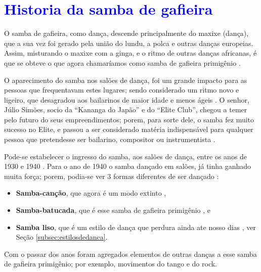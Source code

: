 
\section{\textcolor{blue}{Historia da samba de gafieira}}


O samba de gafieira, como dança, descende principalmente do maxixe (dança),
que a sua vez foi gerado  pela união do  lundu, 
a polca e outras danças europeias.
Assim, misturando o maxixe com a ginga, e o ritmo de outras danças africanas, 
é que se obteve o que agora chamaríamos como samba de gafieira primigênio \cite[pp. 139]{perna2002samba}.


O aparecimento do samba nos salões de dança, 
foi um grande impacto para as pessoas que frequentavam estes lugares;
sendo considerado um ritmo novo e ligeiro,
que desagradou aos bailarinos de maior idade e menos ágeis \cite[pp. 3]{entrevistajuliojournalbrasil1}.
O senhor, Júlio Simões, socio da ``Kananga do Japão'' e
do ``Elite Club'', chegou a temer pelo futuro do seus empreendimentos; porem, para sorte dele, 
o samba fez muito sucesso no Elite,
e passou a ser considerado matéria indispensável para qualquer pessoa que pretendesse ser bailarino, 
compositor ou instrumentista \cite[pp. 3]{entrevistajuliojournalbrasil1}.

Pode-se estabelecer o ingresso do samba, aos salões de dança, entre os anos de 1930 e 1940 \cite[pp. 140]{perna2002samba}.
Para o ano de 1940 o samba dançado em salões, já tinha ganhado muita força;
porem, podia-se ver 3 formas diferentes de ser dançado \cite[pp. 142-143]{perna2002samba}:
\begin{itemize}
\item \textbf{Samba-canção}, que agora é um modo extinto \cite[pp. 143]{perna2002samba},
\item \textbf{Samba-batucada}, que é esse samba de gafieira primigênio \cite[pp. 143]{perna2002samba}, e
\item \textbf{Samba liso}, que é um estilo de dança que perdura ainda ate nosso dias \cite[pp. 143]{perna2002samba}, ver Seção \ref{subsec:estilosdedanca}.
\end{itemize}
Com o passar dos anos foram agregados elementos de outras danças a esse samba de gafieira primigênio;
por exemplo, movimentos do tango e do rock.

